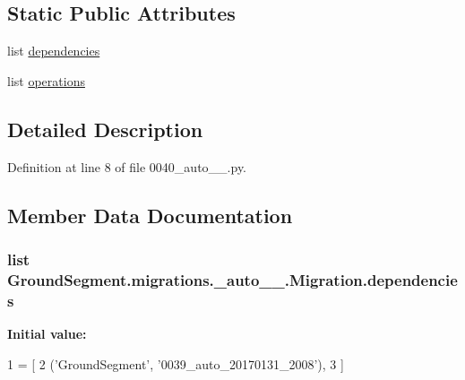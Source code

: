 \subsection*{Static Public Attributes}
\begin{DoxyCompactItemize}
\item 
list \hyperlink{class_ground_segment_1_1migrations_1_10040__auto__20170131__2025_1_1_migration_abd714b42083c5ab4c92452a1ef288c46}{dependencies}
\item 
list \hyperlink{class_ground_segment_1_1migrations_1_10040__auto__20170131__2025_1_1_migration_a1aade2432b7396d1104432b10a466939}{operations}
\end{DoxyCompactItemize}


\subsection{Detailed Description}


Definition at line 8 of file 0040\+\_\+auto\+\_\+\_.\+py.



\subsection{Member Data Documentation}
\hypertarget{class_ground_segment_1_1migrations_1_10040__auto__20170131__2025_1_1_migration_abd714b42083c5ab4c92452a1ef288c46}{}
\subsubsection[{dependencies}]{\setlength{\rightskip}{0pt plus 5cm}list Ground\+Segment.\+migrations.\+\_\+auto\+\_\+\_.\+Migration.\+dependencies\hspace{0.3cm}{\ttfamily [static]}}\label{class_ground_segment_1_1migrations_1_10040__auto__20170131__2025_1_1_migration_abd714b42083c5ab4c92452a1ef288c46}
{\bfseries Initial value\+:}
\begin{DoxyCode}
1 = [
2         (\textcolor{stringliteral}{'GroundSegment'}, \textcolor{stringliteral}{'0039\_auto\_20170131\_2008'}),
3     ]
\end{DoxyCode}



